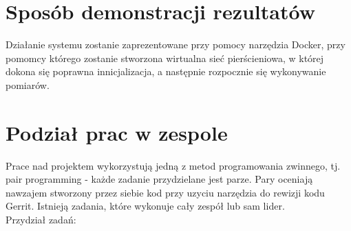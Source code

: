 \documentclass[a4paper,11pt]{article}
\begin{document}
\section{Sposób demonstracji rezultatów}
Działanie systemu zostanie zaprezentowane przy pomocy narzędzia Docker,
przy pomomcy którego zostanie stworzona wirtualna sieć pierścieniowa, w której dokona się poprawna innicjalizacja, a następnie rozpocznie się wykonywanie pomiarów.

\section{Podział prac w zespole}
Prace nad projektem wykorzystują jedną z metod programowania zwinnego,
tj. pair programming - każde zadanie przydzielane jest parze.
Pary oceniają nawzajem stworzony przez siebie kod przy uzyciu narzędzia do rewizji kodu Gerrit.
Istnieją zadania, które wykonuje cały zespół lub sam lider. \\
Przydział zadań:
\end{document}
